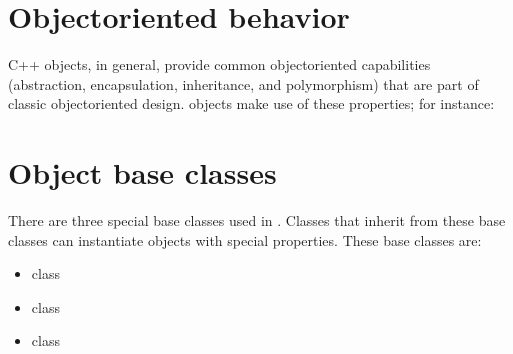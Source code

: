 \documentclass[letterpaper,10pt,english]{sphinxmanual}
\renewcommand{\sphinxcode}[1]{\texttt{\small{#1}}}
\begin{document}
\section{Object\sphinxhyphen{}oriented behavior}
\label{\detokenize{object-model:object-oriented-behavior}}
C++ objects, in general, provide common object\sphinxhyphen{}oriented capabilities
(abstraction, encapsulation, inheritance, and polymorphism) that are part
of classic object\sphinxhyphen{}oriented design.  objects make use of these
properties; for instance:

\begin{sphinxVerbatim}[commandchars=\\\{\}]
 
   
         
      
       
   
   
\end{sphinxVerbatim}


\section{Object base classes}
\label{\detokenize{object-model:object-base-classes}}
There are three special base classes used in . Classes that inherit
from these base classes can instantiate objects with special properties.
These base classes are:
\begin{itemize}
\item {} 
class \sphinxcode{}

\item {} 
class \sphinxcode{}

\item {} 
class \sphinxcode{}

\end{itemize}
\end{document}
